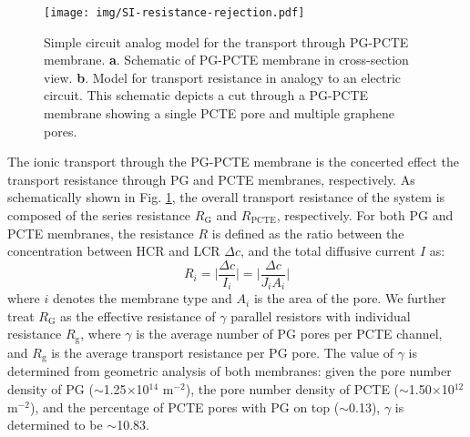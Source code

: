 \documentclass[journal=langd5,email=true, hyperref=true, keywords=false]{achemso}
\begin{document}
\begin{figure}[htbp]
  \centering
  \texttt{[image: img/SI-resistance-rejection.pdf]}
  \caption{Simple circuit analog model for the transport through
    PG-PCTE membrane. \textbf{a}. Schematic of PG-PCTE membrane in
    cross-section view. \textbf{b}. Model for transport resistance in
    analogy to an electric circuit. This schematic depicts a cut
    through a PG-PCTE membrane showing a single PCTE pore and multiple
    graphene pores.}
  \label{fig:R-model}
\end{figure}
The ionic transport through the PG-PCTE membrane is the concerted
effect the transport resistance through PG and PCTE membranes,
respectively. As schematically shown in Fig. \ref{fig:R-model}, the
overall transport resistance of the system is composed of the series
resistance $R_{\mathrm{G}}$ and $R_{\mathrm{PCTE}}$, respectively. For
both PG and PCTE membranes, the resistance $R$ is defined as the ratio
between the concentration between HCR and LCR $\Delta c$, and the total diffusive current $I$ as:
\begin{equation}
\label{eq:1}
R_{i} = \Bigg|\frac{\Delta c}{I_{i}}\Bigg| =  \Bigg|\frac{\Delta c}{J_{i}A_{i}}\Bigg|
\end{equation}
where $i$ denotes the membrane type and $A_{i}$ is the area of the
pore. We further treat $R_{\mathrm{G}}$ as the effective resistance of
$\gamma$ parallel resistors with individual resistance
$R_{\mathrm{g}}$, where $\gamma$ is the average number of PG pores per
PCTE channel, and $R_{\mathrm{g}}$ is the average transport resistance
per PG pore. The value of $\gamma$ is determined from geometric
analysis of both membranes: given the pore number density of PG
($\sim$1.25$\times$10$^{14}$ m$^{-2}$), the pore number density of
PCTE ($\sim$1.50$\times$10$^{12}$ m$^{-2}$), and the percentage of
PCTE pores with PG on top ($\sim$0.13), $\gamma$ is determined to be
$\sim$10.83.
\end{document}
